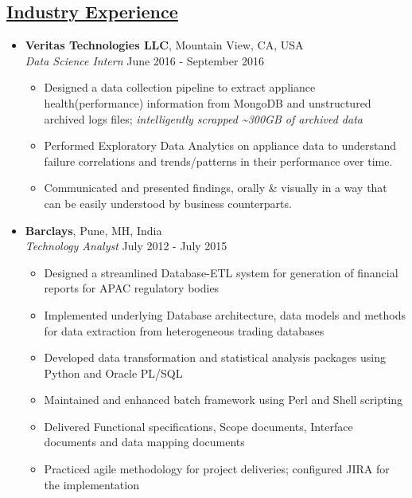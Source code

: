 \documentclass[10pt]{article}
\begin{document}
\subsection*{\underline{Industry Experience}}
\vspace{-0.1cm}
\begin{itemize}[leftmargin=0.15in]
\item {\bfseries Veritas Technologies LLC}, Mountain View, CA, USA \\
{\sl Data Science Intern}  \hfill June 2016 - September 2016
\vspace{-0.25cm}
\begin{itemize}
\setlength{\itemsep}{0pt}%
\item Designed a data collection pipeline to extract appliance health(performance) information from MongoDB and unstructured archived logs files; \textit {intelligently scrapped \~{}300GB of archived data}
\item Performed Exploratory Data Analytics on appliance data to understand failure correlations and trends/patterns in their performance over time.
\item Communicated and presented findings, orally \& visually in a way that can be easily understood by business counterparts.
\end{itemize}

\item  {\bfseries Barclays}, Pune, MH, India \\
{\sl Technology Analyst} \hfill July 2012 - July 2015
\vspace{-0.25cm}
\begin{itemize}
\setlength{\itemsep}{0pt}%
\item Designed a streamlined Database-ETL system for generation of financial reports for APAC regulatory bodies
\item Implemented underlying Database architecture, data models and methods for data extraction from heterogeneous trading databases
\item Developed data transformation and statistical analysis packages using Python and Oracle PL/SQL
\item Maintained and enhanced batch framework using Perl and Shell scripting
\item Delivered Functional specifications, Scope documents, Interface documents and data mapping documents
\item Practiced agile methodology for project deliveries; configured JIRA for the implementation
\end{itemize}
\end{itemize}
\end{document}
